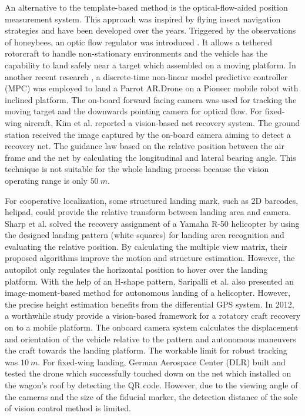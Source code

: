 An alternative to the template-based method is the optical-flow-aided position measurement system. This approach was inspired by flying insect navigation strategies \cite{Green2004} and have been developed over the years. Triggered by the observations of honeybees, an optic flow regulator was introduced \cite{Ruffier2014}. It allows a tethered rotorcraft to handle non-stationary environments and the vehicle has the capability to land safely near a target which assembled on a moving platform. In another recent research \cite{Vlantis2015}, a discrete-time non-linear model predictive controller (MPC) was employed to land a Parrot AR.Drone on a Pioneer mobile robot with inclined platform. The on-board forward facing camera was used for tracking the moving target and the downwards pointing camera for optical flow. For fixed-wing aircraft, Kim et al.\cite{Kim2013} reported a vision-based net recovery system. The ground station received the image captured by the on-board camera aiming to detect a recovery net. The guidance law based on the relative position between the air frame and the net by calculating the longitudinal and lateral bearing angle. This technique is not suitable for the whole landing process because the vision operating range is only $50\ m$.



For cooperative localization, some structured landing mark, such as 2D barcodes, helipad, could provide the relative transform between landing area and camera. Sharp et al. \cite{Sharp2001} solved the recovery assignment of a Yamaha R-50 helicopter by using the designed landing pattern (white squares) for landing area recognition and evaluating the relative position. By calculating the multiple view matrix, their proposed algorithms\cite{Shakernia2002} improve the motion and structure estimation. However, the autopilot only regulates the horizontal position to hover over the landing platform. With the help of an H-shape pattern, Saripalli et al. \cite{Saripalli2003} also presented an image-moment-based method for autonomous landing of a helicopter. However, the precise height estimation benefits from the differential GPS system. In 2012, a worthwhile study \cite{richardsonautomated2013} provide a vision-based framework for a rotatory craft recovery on to a mobile platform. The onboard camera system calculates the displacement and orientation of the vehicle relative to the pattern and autonomous maneuvers the craft towards the landing platform. The workable limit for robust tracking was $10\ m$. For fixed-wing landing, German Aerospace Center (DLR) built and tested the drone which successfully touched down on the net which installed on the wagon's roof by detecting the QR code\cite{DLR_Landing}. However, due to the viewing angle of the cameras and the size of the fiducial marker, the detection distance of the sole of vision control method is limited.


